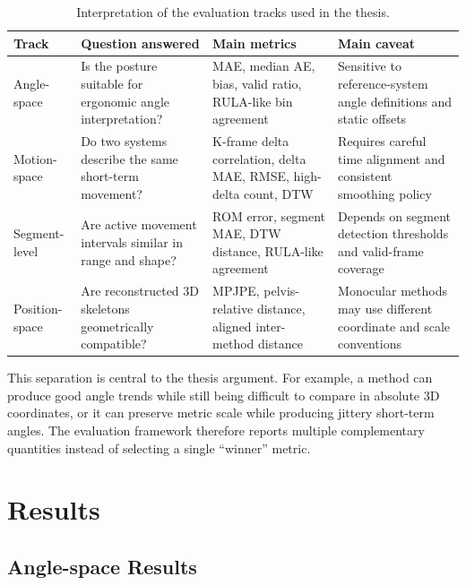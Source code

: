 \documentclass[12pt,a4paper]{article}
\begin{document}
\begin{table}[!htbp]
  \centering
  \caption{Interpretation of the evaluation tracks used in the thesis.}
  \label{tab:evaluation_tracks}
  \small
  \begin{tabularx}{\linewidth}{lXXX}
    \toprule
    Track & Question answered & Main metrics & Main caveat \\
    \midrule
    Angle-space
    & Is the posture suitable for ergonomic angle interpretation?
    & MAE, median AE, bias, valid ratio, RULA-like bin agreement
    & Sensitive to reference-system angle definitions and static offsets \\
    Motion-space
    & Do two systems describe the same short-term movement?
    & K-frame delta correlation, delta MAE, RMSE, high-delta count, DTW
    & Requires careful time alignment and consistent smoothing policy \\
    Segment-level
    & Are active movement intervals similar in range and shape?
    & ROM error, segment MAE, DTW distance, RULA-like agreement
    & Depends on segment detection thresholds and valid-frame coverage \\
    Position-space
    & Are reconstructed 3D skeletons geometrically compatible?
    & MPJPE, pelvis-relative distance, aligned inter-method distance
    & Monocular methods may use different coordinate and scale conventions \\
    \bottomrule
  \end{tabularx}
\end{table}

This separation is central to the thesis argument.
For example, a method can produce good angle trends while still being
difficult to compare in absolute 3D coordinates, or it can preserve metric
scale while producing jittery short-term angles.
The evaluation framework therefore reports multiple complementary quantities
instead of selecting a single ``winner'' metric.

\clearpage
\section{Results}
\label{sec:results}

\subsection{Angle-space Results}
\end{document}
